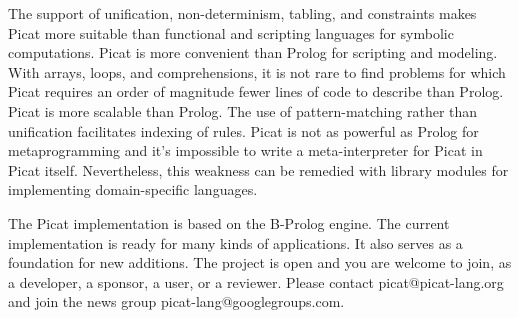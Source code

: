 The support of unification, non-determinism, tabling, and constraints makes Picat more suitable than functional and scripting languages for symbolic computations. Picat is more convenient than Prolog for scripting and modeling. With arrays, loops, and comprehensions, it is not rare to find problems for which Picat requires an order of magnitude fewer lines of code to describe than Prolog. Picat is more scalable than Prolog. The use of pattern-matching rather than unification facilitates indexing of rules. Picat is not as powerful as Prolog for metaprogramming and it's impossible to write a meta-interpreter for Picat in Picat itself. Nevertheless, this weakness can be remedied with library modules for implementing domain-specific languages.

The Picat implementation is based on the B-Prolog engine. The current implementation is ready for many kinds of applications. It also serves as a foundation for new additions. The project is open and you are welcome to join, as a developer, a sponsor, a user, or a reviewer. Please contact picat@picat-lang.org and join the news group picat-lang@googlegroups.com.


